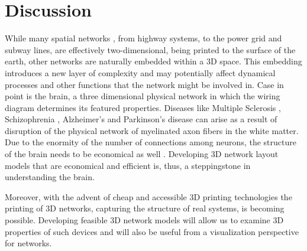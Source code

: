 \documentclass[nofootinbib,preprint,floatfix,endfloats]{revtex4} %
\begin{document}

\section{Discussion}

While many spatial networks \cite{barthelemy2011spatial}, from highway systems, to the power grid and subway lines, are effectively two-dimensional, 
being printed to the surface of the earth, other networks are naturally embedded within a 3D space. 
This embedding introduces a new layer of complexity and may potentially affect dynamical processes and other functions that the network might be involved in. Case in point is the brain, a three dimensional physical network in which the wiring diagram determines its featured properties. 
Diseases like Multiple Sclerosis \cite{compston2008ms,miller2007ms,miller2005ms}, Schizophrenia \cite{davis2003white,lim1999compromised,sigmundsson2001structural}, Alzheimer's \cite{mudher2002alzheimer,goedert1991tau,goedert1992tau} and Parkinson's disease \cite{bohnen2011white,beyer2006visual,hattori2012cognitive} can arise as a result of disruption of the physical network of myelinated axon fibers in the white matter. 
Due to the enormity of the number of connections among neurons, the structure of the brain needs to be economical as well \cite{bullmore2012economy,sporns2004organization,kotter2001connectional}. Developing 3D network layout models that are economical and efficient is, thus, a steppingstone in understanding the brain. 

Moreover, with the advent of cheap and accessible 3D printing technologies the printing of 3D networks, capturing the structure of real systems, is becoming possible. 
Developing feasible 3D network models will allow us to examine 3D properties of such devices and will also be useful from a visualization perspective for networks.
\end{document}
